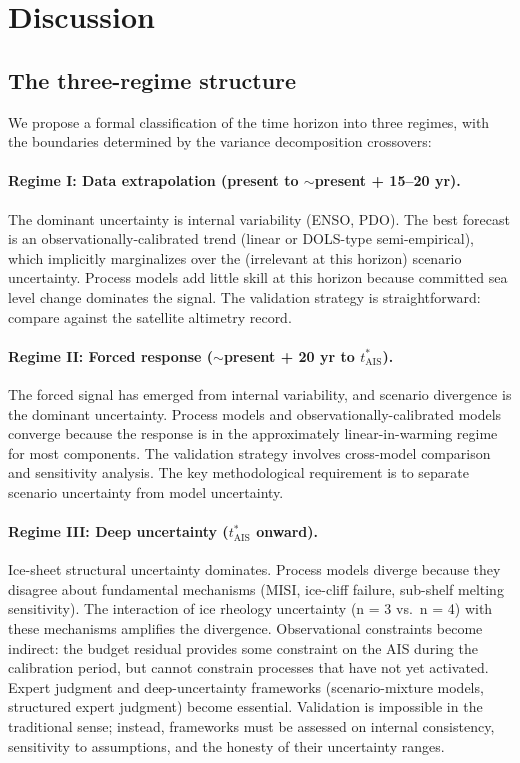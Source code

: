 \documentclass[11pt]{article}
\begin{document}
\section{Discussion}
\label{sec:discussion}

\subsection{The three-regime structure}

We propose a formal classification of the time horizon into three regimes, with the boundaries determined by the variance decomposition crossovers:

\paragraph{Regime I: Data extrapolation (present to $\sim$present + 15--20 yr).}  The dominant uncertainty is internal variability (ENSO, PDO).  The best forecast is an observationally-calibrated trend (linear or DOLS-type semi-empirical), which implicitly marginalizes over the (irrelevant at this horizon) scenario uncertainty.  Process models add little skill at this horizon because committed sea level change dominates the signal.  The validation strategy is straightforward: compare against the satellite altimetry record.

\paragraph{Regime II: Forced response ($\sim$present + 20 yr to $t^*_{\text{AIS}}$).}  The forced signal has emerged from internal variability, and scenario divergence is the dominant uncertainty.  Process models and observationally-calibrated models converge because the response is in the approximately linear-in-warming regime for most components.  The validation strategy involves cross-model comparison and sensitivity analysis.  The key methodological requirement is to separate scenario uncertainty from model uncertainty.

\paragraph{Regime III: Deep uncertainty ($t^*_{\text{AIS}}$ onward).}  Ice-sheet structural uncertainty dominates.  Process models diverge because they disagree about fundamental mechanisms (MISI, ice-cliff failure, sub-shelf melting sensitivity).  The interaction of ice rheology uncertainty (n = 3 vs.\ n = 4) with these mechanisms amplifies the divergence.  Observational constraints become indirect: the budget residual provides some constraint on the AIS during the calibration period, but cannot constrain processes that have not yet activated.  Expert judgment and deep-uncertainty frameworks (scenario-mixture models, structured expert judgment) become essential.  Validation is impossible in the traditional sense; instead, frameworks must be assessed on internal consistency, sensitivity to assumptions, and the honesty of their uncertainty ranges.
\end{document}

